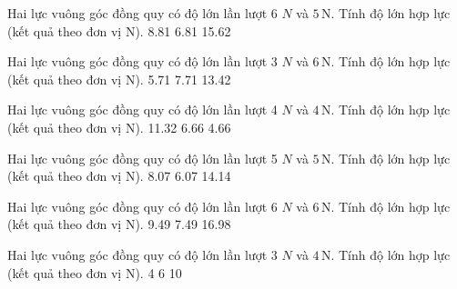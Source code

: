 \begin{ex}
Hai lực vuông góc đồng quy có độ lớn lần lượt 6 $N$ và $5\,\text{N}$. Tính độ lớn hợp lực (kết quả theo đơn vị N).
\choice
{8.81}
{}
{6.81}
{15.62}
\end{ex}

\begin{ex}
Hai lực vuông góc đồng quy có độ lớn lần lượt 3 $N$ và $6\,\text{N}$. Tính độ lớn hợp lực (kết quả theo đơn vị N).
\choice
{5.71}
{7.71}
{}
{13.42}
\end{ex}

\begin{ex}
Hai lực vuông góc đồng quy có độ lớn lần lượt 4 $N$ và $4\,\text{N}$. Tính độ lớn hợp lực (kết quả theo đơn vị N).
\choice
{11.32}
{6.66}
{4.66}
{}
\end{ex}

\begin{ex}
Hai lực vuông góc đồng quy có độ lớn lần lượt 5 $N$ và $5\,\text{N}$. Tính độ lớn hợp lực (kết quả theo đơn vị N).
\choice
{}
{8.07}
{6.07}
{14.14}
\end{ex}

\begin{ex}
Hai lực vuông góc đồng quy có độ lớn lần lượt 6 $N$ và $6\,\text{N}$. Tính độ lớn hợp lực (kết quả theo đơn vị N).
\choice
{9.49}
{}
{7.49}
{16.98}
\end{ex}

\begin{ex}
Hai lực vuông góc đồng quy có độ lớn lần lượt 3 $N$ và $4\,\text{N}$. Tính độ lớn hợp lực (kết quả theo đơn vị N).
\choice
{4}
{6}
{}
{10}
\end{ex}

